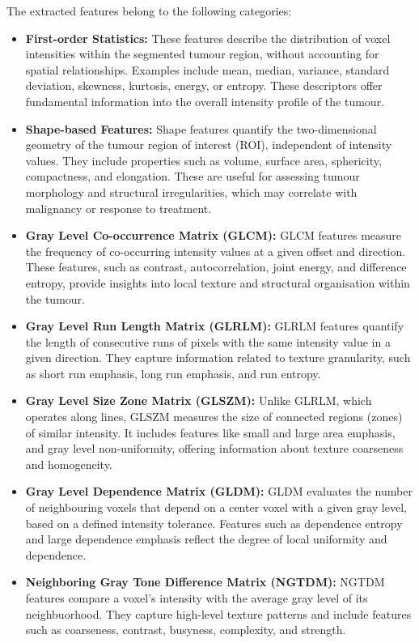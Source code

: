 \documentclass[12pt, a4paper]{report}
\begin{document}
The extracted features belong to the following categories:

\begin{itemize}
    \item \textbf{First-order Statistics:} These features describe the distribution of voxel intensities within the segmented tumour region, without accounting for spatial relationships. Examples include mean, median, variance, standard deviation, skewness, kurtosis, energy, or entropy. These descriptors offer fundamental information into the overall intensity profile of the tumour.

    \item \textbf{Shape-based Features:} Shape features quantify the two-dimensional geometry of the tumour region of interest (ROI), independent of intensity values. They include properties such as volume, surface area, sphericity, compactness, and elongation. These are useful for assessing tumour morphology and structural irregularities, which may correlate with malignancy or response to treatment.

    \item \textbf{Gray Level Co-occurrence Matrix (GLCM):} GLCM features measure the frequency of co-occurring intensity values at a given offset and direction. These features, such as contrast, autocorrelation, joint energy, and difference entropy, provide insights into local texture and structural organisation within the tumour.

    \item \textbf{Gray Level Run Length Matrix (GLRLM):} GLRLM features quantify the length of consecutive runs of pixels with the same intensity value in a given direction. They capture information related to texture granularity, such as short run emphasis, long run emphasis, and run entropy.

    \item \textbf{Gray Level Size Zone Matrix (GLSZM):} Unlike GLRLM, which operates along lines, GLSZM measures the size of connected regions (zones) of similar intensity. It includes features like small and large area emphasis, and gray level non-uniformity, offering information about texture coarseness and homogeneity.

    \item \textbf{Gray Level Dependence Matrix (GLDM):} GLDM evaluates the number of neighbouring voxels that depend on a center voxel with a given gray level, based on a defined intensity tolerance. Features such as dependence entropy and large dependence emphasis reflect the degree of local uniformity and dependence.

    \item \textbf{Neighboring Gray Tone Difference Matrix (NGTDM):} NGTDM features compare a voxel’s intensity with the average gray level of its neighbuorhood. They capture high-level texture patterns and include features such as coarseness, contrast, busyness, complexity, and strength.

\end{itemize}
\end{document}
